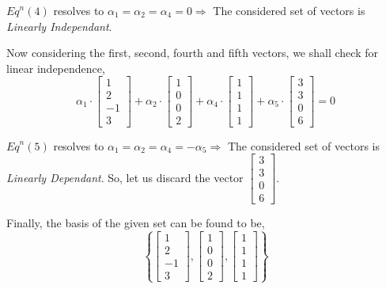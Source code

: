 \documentclass[a4paper]{article}
\begin{document}
\begin{qalist}
			
			${Eq}^{n} (4)$ resolves to ${\alpha}_{1} = {\alpha}_{2} = {\alpha}_{4} = 0 \Rightarrow$ The considered set of vectors is \textit{Linearly Independant}.
			
			Now considering the first, second, fourth and fifth vectors, we shall check for linear independence,
			\begin{equation}
				{\alpha}_{1}\cdot\left[\begin{matrix}1 \\ 2 \\ -1 \\ 3\end{matrix}\right] + 
				{\alpha}_{2}\cdot\left[\begin{matrix}1 \\ 0 \\ 0 \\ 2\end{matrix}\right] + 
				{\alpha}_{4}\cdot\left[\begin{matrix}1 \\ 1 \\ 1 \\ 1\end{matrix}\right] +
				{\alpha}_{5}\cdot\left[\begin{matrix}3 \\ 3 \\ 0 \\ 6\end{matrix}\right]
				 = 0
			\end{equation}
			
			${Eq}^{n} (5)$ resolves to ${\alpha}_{1} = {\alpha}_{2} = {\alpha}_{4} = -{\alpha}_{5} \Rightarrow$ The considered set of vectors is \textit{Linearly Dependant}. So, let us discard the vector $\left[\begin{matrix}3 \\ 3 \\ 0 \\ 6\end{matrix}\right]$.
			
			Finally, the basis of the given set can be found to be, 
			\begin{equation}
				\left\{ \left[\begin{matrix}1 \\ 2 \\ -1 \\ 3\end{matrix}\right], 
					\left[\begin{matrix}1 \\ 0 \\ 0 \\ 2\end{matrix}\right], 
					\left[\begin{matrix}1 \\ 1 \\ 1 \\ 1\end{matrix}\right]
				\right\}
			\end{equation}
			

\end{qalist}
\end{document}
